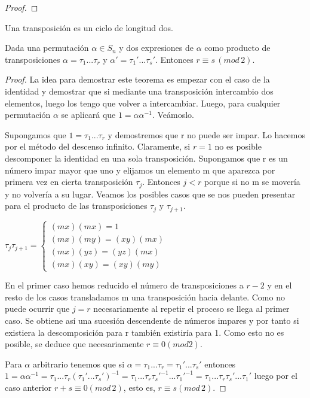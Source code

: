 \begin{proof}

\end{proof}

\begin{definition}[Transposición]
Una transposición es un ciclo de longitud dos.
\end{definition}

\begin{theorem}\label{theorem:paridad-permutacion} 
Dada una permutación $\alpha \in S_n$ y dos expresiones de $\alpha$ como producto de transposiciones $\alpha = \tau_1...\tau_r$ y $\alpha' = \tau_1'...\tau_s'$. Entonces $r \equiv s \, (mod \, 2)$.
\end{theorem}

\begin{proof}
La idea para demostrar este teorema es empezar con el caso de la identidad y demostrar que si mediante una transposición intercambio dos elementos, luego los tengo que volver a intercambiar. Luego, para cualquier permutación $\alpha$ se aplicará que $1 = \alpha\alpha^{-1}$. Veámoslo.

Supongamos que $1 = \tau_1...\tau_r$ y demostremos que r no puede ser impar. Lo hacemos por el método del descenso infinito. Claramente, si $r = 1$ no es posible descomponer la identidad en una sola transposición. Supongamos que r es un número impar mayor que uno y elijamos un elemento m que aparezca por primera vez en cierta transposición $\tau_j$. Entonces $j < r$ porque si no m se movería y no volvería a su lugar. Veamos los posibles casos que se nos pueden presentar para el producto de las transposiciones $\tau_j$ y $\tau_{j+1}$.

$\tau_j\tau_{j+1}=
\begin{cases}
(mx)(mx) = 1 \\
(mx)(my) = (xy)(mx) \\
(mx)(yz) = (yz)(mx) \\
(mx)(xy) = (xy)(my)
\end{cases}$

En el primer caso hemos reducido el número de transposiciones a $r-2$ y en el resto de los casos transladamos m una transposición hacia delante. Como no puede ocurrir que $j = r$ necesariamente al repetir el proceso se llega al primer caso. Se obtiene así una sucesión descendente de números impares y por tanto si existiera la descomposición para r también existiría para 1. Como esto no es posible, se deduce que necesariamente $r \equiv 0 (mod 2)$.

Para $\alpha$ arbitrario tenemos que si $\alpha = \tau_1...\tau_r = \tau_1'...\tau_s'$ entonces $1 = \alpha\alpha^{-1} = \tau_1...\tau_r(\tau_1'...\tau_s')^{-1} = \tau_1...\tau_r\tau_s'^{-1}...\tau_1'^{-1} = \tau_1...\tau_r\tau_s'...\tau_1'$ luego por el caso anterior $r+s \equiv 0 (mod \, 2)$, esto es, $r \equiv s (mod \, 2)$.
\end{proof}

